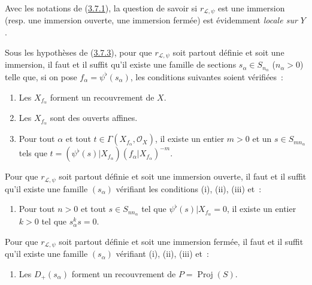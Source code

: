 \begin{env}[3.8.1]
\label{II.3.8.1-fr}
Avec les notations de (\hyperref[II.3.7.1-fr]{3.7.1}), la question de savoir
si $r_{\mathcal{L},\psi}$ est une immersion (resp. une immersion ouverte, une
immersion fermée) est évidemment \emph{locale sur $Y$}.
\end{env}

\begin{proposition}[3.8.2]
\label{II.3.8.2-fr}
Sous les hypothèses de \textup{(\hyperref[II.3.7.3-fr]{3.7.3})}, pour que
$r_{\mathcal{L},\psi}$ soit partout définie et soit une immersion, il faut et
il suffit qu'il existe une famille de sections $s_\alpha\in S_{n_\alpha}$
($n_\alpha>0$) telle que, si on pose
$f_\alpha=\psi^\flat(s_\alpha)$, les conditions suivantes soient vérifiées~:
\begin{enumerate}
  \item[\textup{(i)}] Les $X_{f_\alpha}$ forment un recouvrement de $X$.
  \item[\textup{(ii)}] Les $X_{f_\alpha}$ sont des ouverts affines.
  \item[\textup{(iii)}] Pour tout $\alpha$ et tout
    $t\in\Gamma(X_{f_\alpha},\mathcal{O}_X)$, il existe un entier $m>0$ et
    un $s\in S_{mn_\alpha}$ tels que
    $t=(\psi^\flat(s)|X_{f_\alpha})(f_\alpha|X_{f_\alpha})^{-m}$.
\end{enumerate}

Pour que $r_{\mathcal{L},\psi}$ soit partout définie et soit une immersion
ouverte, il faut et il suffit qu'il existe une famille $(s_\alpha)$ vérifiant
les conditions \textup{(i), (ii), (iii)} et~:
\begin{enumerate}
  \item[\textup{(iv)}] Pour tout $n>0$ et tout $s\in S_{nn_\alpha}$ tel que
    $\psi^\flat(s)|X_{f_\alpha}=0$, il existe un entier $k>0$ tel que
    $s_\alpha^ks=0$.
\end{enumerate}

Pour que $r_{\mathcal{L},\psi}$ soit partout définie et soit une immersion
fermée, il faut et il suffit qu'il existe une famille $(s_\alpha)$ vérifiant
\textup{(i), (ii), (iii)} et~:
\begin{enumerate}
  \item[\textup{(v)}] Les $D_+(s_\alpha)$ forment un recouvrement de
    $P=\operatorname{Proj}(S)$.
\end{enumerate}
\end{proposition}

